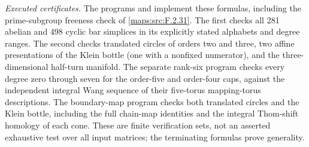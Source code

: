 \documentclass[11pt,a4paper]{article}
\theoremstyle{definition}
\begin{document}
\emph{Executed certificates.}
The programs  and
 implement these
formulas, including the prime-subgroup freeness check of \ref{maps:src:F.2.31}.
The first checks all 281 abelian and 498 cyclic bar simplices
in its explicitly stated alphabets and degree ranges.
The second checks translated circles of orders two and three,
two affine presentations of the Klein bottle (one with a
nonfixed numerator), and the three-dimensional half-turn
manifold.  The separate rank-six program checks every degree
zero through seven for the order-five and order-four caps,
against the independent integral Wang sequence of their
five-torus mapping-torus descriptions.
The boundary-map program checks both translated circles and
the Klein bottle, including the full chain-map identities and
the integral Thom-shift homology of each cone.  These are
finite verification sets, not an asserted exhaustive test over
all input matrices; the terminating formulas prove generality.
\end{document}
